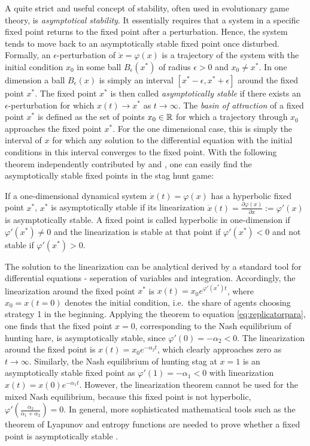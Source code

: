 A quite strict and useful concept of stability, often used in evolutionary 
game theory, is \textit{asymptotical stability}. 
It essentially requires that a system in a specific fixed point returns 
to the fixed point after a perturbation.
Hence, the system tends to move back to an asymptotically stable fixed point
once disturbed. Formally, an $\epsilon$-perturbation of 
$\dot{x} = \varphi(x)$ is a trajectory of the system with the initial
condition $x_0$ in some ball $B_\epsilon(x^*)$ of radius $\epsilon >0$ and 
$x_0 \neq x^*$. 
In one dimension a ball $B_{\epsilon}(x)$ is simply an interval 
$[x^*-\epsilon, x^*+\epsilon]$ around the fixed point $x^*$.
The fixed point $x^*$ is then called \textit{asymptotically
stable} if there exists an $\epsilon$-perturbation for which $x(t) \rightarrow
x^*$ as $t \rightarrow \infty$. 
The \textit{basin of attraction} of a fixed point $x^*$ is defined as the set 
of points $x_0 \in \mathbb{R}$ for which a trajectory through $x_0$ approaches 
the fixed point $x^*$. For the one dimensional case, 
this is simply the interval 
of $x$ for which any solution to the differential equation with the initial 
conditions in this interval converges to the fixed point. With the following 
theorem independently contributed by \textcite{hartman_lemma_1960} and 
\textcite{grobman_homeomorphism_1959}, one can easily 
find the asymptotically stable fixed points in the stag hunt game:
\begin{mydef}
        If a one-dimensional dynamical system $\dot{x}(t) = \varphi(x)$ 
        has a hyperbolic fixed point $x^*$, $x^*$ is asymptotically stable
        if its linearization 
        $\dot{x}(t) = \frac{\partial\varphi(x)}{\partial x} := \varphi'(x)$ 
        is asymptotically stable. 
        A fixed point is called hyperbolic in one-dimension if 
        $\varphi'(x^*) \neq 0$ and the linearization is stable at that
        point if $\varphi'(x^*) < 0$ and not stable if $\varphi'(x^*) >0$.
\end{mydef}
The solution to the linearization can be analytical derived by 
a standard tool for differential equations - seperation of variables and 
integration.
Accordingly, the linearization around the fixed point $x^*$ is 
$x(t)= x_0 e^{\varphi'(x^*)t}$, where $x_0=x(t=0)$ denotes the 
initial condition, i.e.\ the share of agents choosing strategy 1 in the 
beginning.
Applying the theorem to equation \eqref{eq:replicatorpara}, 
one finds that the 
fixed point $x=0$, corresponding to the Nash equilibrium of hunting hare, is 
asymptotically stable, since $\varphi'(0) = - \alpha_2 <0$. 
The linearization around the fixed point is $x(t) = x_0 e^{-\alpha_2 t}$, 
which clearly approaches zero as $t \rightarrow \infty$. 
Similarly, the Nash equilibrium 
of hunting stag at $x=1$ is an asymptotically stable fixed point as
$\varphi'(1) = -\alpha_1 <0$ with linearization $x(t) = x(0) e^{-\alpha_1 t}$.
However, the linearization theorem cannot be used for the mixed Nash 
equilibrium, because this fixed point is not hyperbolic, 
$\varphi'(\frac{\alpha_2}{\alpha_1+\alpha_2}) = 0$.
In general, more sophisticated mathematical tools such as the theorem of 
Lyapunov and entropy functions are needed to prove whether a fixed point
is asymptotically stable \parencite{friedman_economic_1998}.

